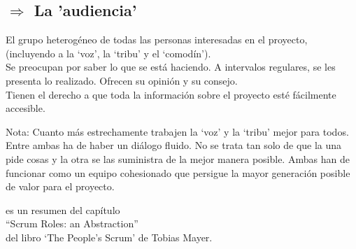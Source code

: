 \documentclass[12pt,a4paper]{article}
\begin{document}
\subsection*{$\Rightarrow$ La 'audiencia'}
El grupo heterogéneo de todas las personas interesadas en el proyecto, (incluyendo a la `voz', la `tribu' y el `comodín').
\\Se preocupan por saber lo que se está haciendo. A intervalos regulares, se les presenta lo realizado. Ofrecen su opinión y su consejo.
\\Tienen el derecho a que toda la información sobre el proyecto esté fácilmente accesible.

\vspace{1cm}
Nota: Cuanto más estrechamente trabajen la `voz' y la `tribu' mejor para todos. Entre ambas ha de haber un diálogo fluido. No se trata tan solo de que la una pide cosas y la otra se las suministra de la mejor manera posible. Ambas han de funcionar como un equipo cohesionado que persigue la mayor generación posible de valor para el proyecto.

\begin{flushright}
es un resumen del capítulo\\``Scrum Roles: an Abstraction''\\del libro `The People's Scrum' de Tobias Mayer.
\end{flushright}
\end{document}
